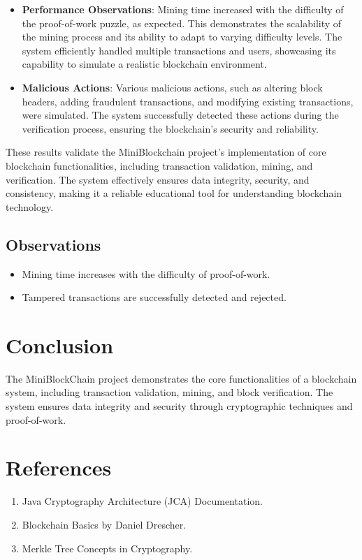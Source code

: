\documentclass[12pt]{article}
\begin{document}
\begin{itemize}
    \item \textbf{Performance Observations}: Mining time increased with the difficulty of the proof-of-work puzzle, as expected. This demonstrates the scalability of the mining process and its ability to adapt to varying difficulty levels. The system efficiently handled multiple transactions and users, showcasing its capability to simulate a realistic blockchain environment.

    \item \textbf{Malicious Actions}: Various malicious actions, such as altering block headers, adding fraudulent transactions, and modifying existing transactions, were simulated. The system successfully detected these actions during the verification process, ensuring the blockchain's security and reliability.
\end{itemize}

These results validate the MiniBlockchain project's implementation of core blockchain functionalities, including transaction validation, mining, and verification. The system effectively ensures data integrity, security, and consistency, making it a reliable educational tool for understanding blockchain technology.

\subsection{Observations}
\begin{itemize}
    \item Mining time increases with the difficulty of proof-of-work.
    \item Tampered transactions are successfully detected and rejected.
\end{itemize}

\section{Conclusion}
The MiniBlockChain project demonstrates the core functionalities of a blockchain system, including transaction validation, mining, and block verification. The system ensures data integrity and security through cryptographic techniques and proof-of-work.

\section{References}
\begin{enumerate}
    \item Java Cryptography Architecture (JCA) Documentation.
    \item Blockchain Basics by Daniel Drescher.
    \item Merkle Tree Concepts in Cryptography.
\end{enumerate}
\end{document}
